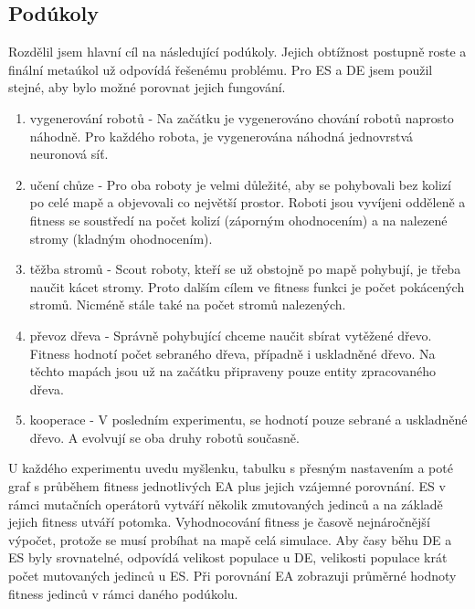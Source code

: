 \subsection*{Podúkoly} 
Rozdělil jsem hlavní cíl na následující podúkoly. Jejich obtížnost postupně roste a finální metaúkol už odpovídá řešenému problému. Pro ES a DE jsem použil stejné, aby bylo možné porovnat jejich fungování. 
\begin{enumerate}
        \item vygenerování robotů - Na začátku je vygenerováno chování robotů naprosto náhodně. Pro každého robota, je vygenerována náhodná jednovrstvá neuronová síť. 
        \item učení chůze - Pro oba roboty je velmi důležité, aby se pohybovali bez kolizí po celé mapě a objevovali co největší prostor. Roboti jsou vyvíjeni odděleně a fitness se soustředí na počet kolizí (záporným ohodnocením) a na nalezené stromy (kladným ohodnocením).
        \item těžba stromů - Scout roboty, kteří se už obstojně po mapě pohybují, je třeba naučit kácet stromy. Proto dalším  cílem ve fitness funkci je počet pokácených stromů. Nicméně stále také na počet stromů nalezených. 
        \item převoz dřeva - Správně pohybující chceme naučit sbírat vytěžené dřevo. Fitness hodnotí počet sebraného dřeva, případně i uskladněné dřevo. Na těchto mapách jsou už na začátku připraveny pouze entity zpracovaného dřeva.
        \item kooperace - V posledním experimentu, se hodnotí pouze sebrané a uskladněné dřevo. A evolvují se oba druhy robotů současně. 
\end{enumerate}
U každého experimentu uvedu myšlenku, tabulku s přesným nastavením a poté graf s průběhem fitness jednotlivých EA plus jejich vzájemné porovnání. ES v rámci mutačních operátorů vytváří několik zmutovaných jedinců a na základě jejich fitness utváří potomka. Vyhodnocování fitness je časově nejnáročnější výpočet, protože se musí probíhat na mapě celá simulace. Aby časy běhu DE a ES byly srovnatelné, odpovídá velikost populace u DE, velikosti populace krát počet mutovaných jedinců u ES. Při porovnání EA zobrazuji průměrné hodnoty fitness jedinců v rámci daného podúkolu. 
